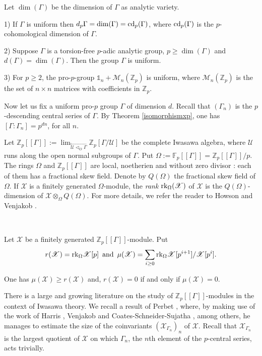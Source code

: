 \documentclass[12pt,a4paper,twoside,english]{smfart}
\def\Z{{\mathbb Z}}
\def\fq{{\mathbb F}}
\def\X{{\mathcal X}}
\def\U{{\mathcal U}}
\def\M{{\mathcal M}}
\def\rg{{\rm rk}}
\def\cd{{\rm cd}}
\def\cd{{\rm cd}}
\begin{document}
\begin{rema} Let $\dim(\Gamma)$ be the dimension of  $\Gamma$ as analytic variety. 

1) If $\Gamma$ is uniform then $d_p \Gamma = \dim(\Gamma)= \cd_p(\Gamma)$, where
$\cd_p(\Gamma)$ is the $p$-cohomological dimension of $\Gamma$.

2) \cite[Corollary 1.8]{Klopsch-Snopce} Suppose $\Gamma$ is a torsion-free $p$-adic analytic group, $p \geq \dim(\Gamma) $ and  $d(\Gamma)= \dim(\Gamma)$. Then the group $\Gamma$ is uniform.

3) For $p \geq 2$, the pro-$p$-group $\mathbb{1}_n+\M_n(\Z_p)$ is uniform, where $\M_n(\Z_p)$ is the the set of   $n\times n$ matrices with coefficients in  $\Z_p$.
\end{rema}

\medskip 

 Now let us fix a uniform pro-$p$ group  $\Gamma$ of dimension $d$. 
Recall that $(\Gamma_n)$ is the $p$-descending central series of $\Gamma$.  By Theorem \ref{isomorphismxp}, one has
$[\Gamma:\Gamma_n]=p^{dn}$, for all $n$.

\medskip


Let $\displaystyle{\Z_p[[\Gamma]]:=\lim_{\stackrel{\longleftarrow}{\U \lhd_O \Gamma }} \Z_p[\Gamma/\U]}$ be the complete Iwasawa algebra, where $\U$ runs along the open normal subgroups of $\Gamma$. Put $\Omega:=\fq_p[[\Gamma]] = \Z_p[[\Gamma]]/p$. The rings $\Omega$ and $\Z_p[[\Gamma]]$ are local, noetherien and without zero divisor \cite[\S 7.4]{DSMN}:  each of them    has a fractional skew field. Denote by   $Q(\Omega)$ the fractional skew field of $\Omega$. 
If $\X$ is a finitely generated $\Omega$-module, the \emph{rank} $\rg_\Omega(\X)$ of $\X$ is the  $Q(\Omega)$-dimension of $\X\otimes_{\Omega} Q(\Omega)$.
For more details, we refer the reader to Howson \cite{Ho} and Venjakob \cite{venjakob}.



\

\begin{defi} Let $\X$ be a finitely generated $\Z_p[[\Gamma]]$-module. Put $$r(\X) = \rg_\Omega \X[p] \, \, \, {\rm and \ } \, \mu(\X)= \sum_{i\geq 0}
\rg_\Omega \X[p^{i+1}]/\X[p^{i}].$$
\end{defi}


\begin{rema} One has $\mu(\X) \geq r(\X)$ and, 
 $r(\X) =0$ if and only if $\mu(\X)=0$.
\end{rema}

There is a large and growing literature on the study 
of $\Z_p[[\Gamma]]$-modules in the context of Iwasawa theory. We recall
a result of Perbet \cite{Perbet2}, where, by making use of the work of Harris \cite{Harris}, Venjakob \cite{venjakob} and  Coates-Schneider-Sujatha \cite{CSS},  among others, he manages to estimate the size of the coinvariants $(\X_{\Gamma_n})_n$  of $\X$.  Recall that $\X_{\Gamma_n}$ is the largest quotient of $\X$ on which $\Gamma_n$, the $n$th element of the $p$-central series, acts trivially.
 
\end{document}
